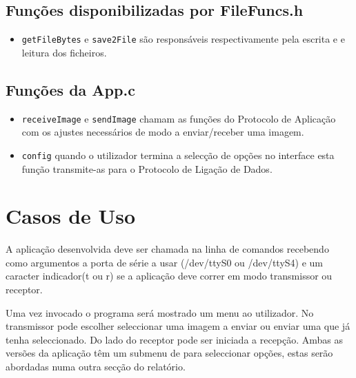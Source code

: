 \documentclass[11pt,a4paper,reqno]{report}
\numberwithin{equation}{section}
\begin{document}
\subsection{Funções disponibilizadas por FileFuncs.h}
\begin{itemize}
\item \verb|getFileBytes| e \verb|save2File| são responsáveis respectivamente pela escrita e e leitura dos ficheiros.
\end{itemize}


\subsection{Funções da App.c}
\begin{itemize}
\item \verb|receiveImage| e \verb|sendImage| chamam as funções do Protocolo de Aplicação com os ajustes necessários de modo a enviar/receber uma imagem.
\item \verb|config| quando o utilizador termina a selecção de opções no interface esta função transmite-as para o Protocolo de Ligação de Dados.
\end{itemize}


\section{Casos de Uso}

A aplicação desenvolvida deve ser chamada na linha de comandos recebendo como argumentos a porta de série a usar (/dev/ttyS0 ou /dev/ttyS4) e um caracter indicador(t ou r) se a aplicação deve correr em modo transmissor ou receptor.

Uma vez invocado o programa será mostrado um menu ao utilizador. No transmissor pode escolher seleccionar uma imagem a enviar ou enviar uma que já tenha seleccionado. Do lado do receptor pode ser iniciada a recepção. Ambas as versões da aplicação têm um submenu de para seleccionar  opções, estas  serão abordadas numa outra secção do relatório.
\end{document}
